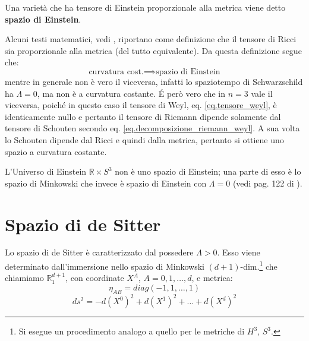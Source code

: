 \begin{definizione}
Una varietà che ha tensore di Einstein proporzionale alla metrica viene detto \textbf{spazio di Einstein}.
\end{definizione}
Alcuni testi matematici, vedi \cite{bruhat_manifolds}, riportano come definizione che il tensore di Ricci sia proporzionale alla metrica (del tutto equivalente).
Da questa definizione segue che:
\begin{equation*}
    \textrm{curvatura cost.} \implies \textrm{spazio di Einstein}
\end{equation*}
mentre in generale non è vero il viceversa, infatti lo spaziotempo di Schwarzschild ha $\Lambda = 0$, ma non è a curvatura costante. \'E però vero che in $n=3$ vale il viceversa, poiché in questo caso il tensore di Weyl, eq. \ref{eq.tensore_weyl}, è identicamente nullo e pertanto il tensore di Riemann dipende solamente dal tensore di Schouten secondo eq. \ref{eq.decomposizione_riemann_weyl}. A sua volta lo Schouten dipende dal Ricci e quindi dalla metrica, pertanto si ottiene uno spazio a curvatura costante. 

L'Universo di Einstein $\mathbb R \times S^3$ non è uno spazio di Einstein; una parte di esso è lo spazio di Minkowski che invece è spazio di Einstein con $\Lambda = 0$ (vedi pag. 122 di \cite{hawking}).
\section{Spazio di de Sitter}
Lo spazio di de Sitter è caratterizzato dal possedere $\Lambda > 0$. Esso viene determinato dall'immersione nello spazio di Minkowski $(d+1)$-dim.\footnote{Si esegue un procedimento analogo a quello per le metriche di $H^3$, $S^3$.} che chiamiamo $\mathbb{R}^{d+1}_1$, con coordinate $X^A$, $A = 0,1, \dots, d$, e metrica:
\begin{equation*}
    \eta_{AB} = diag(-1,1,\dots, 1)
\end{equation*}
\begin{equation*}
    ds^2 = - d(X^0)^2 + d(X^1)^2 + \dots + d(X^d)^2 
\end{equation*}

